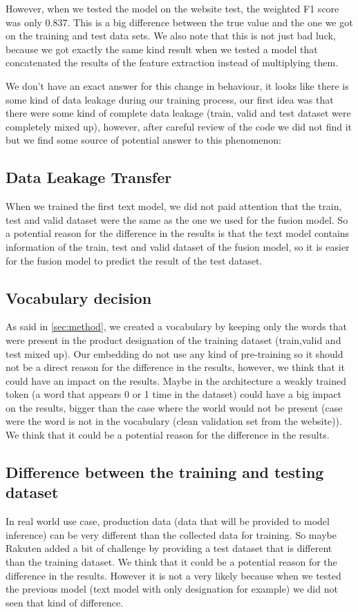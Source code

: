 However, when we tested the model on the website test, the weighted F1 score was only 0.837. This is a big difference between the true value and the one we got on the training and test data sets. We also note that this is not just bad luck, because we got exactly the same kind result when we tested a model that concatenated the results of the feature extraction instead of multiplying them.

We don't have an exact answer for this change in behaviour, it looks like there is some kind of data leakage during our training process, our first idea was that there were some kind of complete data leakage (train, valid and test dataset were completely mixed up), however, after careful review of the code we did not find it  but we find some source of potential answer to this phenomenon:

\subsection{Data Leakage Transfer}

When we trained the first text model, we did not paid attention that the train, test and valid dataset were the same as the one we used for the fusion model. So a potential reason for the difference in the results is that the text model contains information of the train, test and valid dataset of the fusion model, so it is easier for the fusion model to predict the result of the test dataset.

\subsection{Vocabulary decision}

As said in \ref{sec:method}, we created a vocabulary by keeping only the words that were present in the product designation of the training dataset (train,valid and test mixed up). Our embedding do not use any kind of pre-training so it should not be a direct reason for the difference in the results, however, we think that it could have an impact on the results. Maybe in the architecture a weakly trained token (a word that appears 0 or 1 time in the dataset) could have a big impact on the results, bigger than the case where the world would not be present (case were the word is not in the vocabulary (clean validation set from the website)). We think that it could be a potential reason for the difference in the results.

\subsection{Difference between the training and testing dataset}

In real world use case, production data (data that will be provided to model inference) can be very different than the collected data for training. So maybe Rakuten added a bit of challenge by providing a test dataset that is  different than the training dataset. We think that it could be a potential reason for the difference in the results. However it is not a very likely because when we tested the previous model (text model with only designation for example) we did not seen that kind of difference.